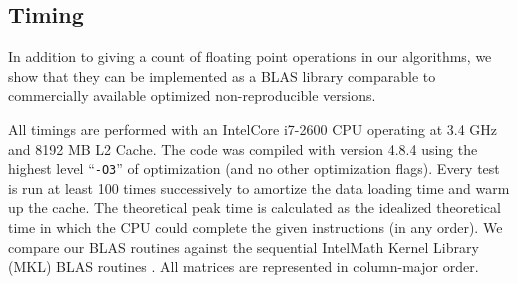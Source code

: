 \subsection{Timing}
  In addition to giving a count of floating point operations in our algorithms, we show that they can be implemented as a BLAS library comparable to commercially available optimized non-reproducible versions.

  All timings are performed with an Intel\textregistered Core i7-2600 CPU operating at 3.4 GHz and 8192 MB L2 Cache. The code was compiled with  version 4.8.4 using the highest level ``\texttt{-O3}'' of optimization (and no other optimization flags). Every test is run at least 100 times successively to amortize the data loading time and warm up the cache. The theoretical peak time is calculated as the idealized theoretical time in which the CPU could complete the given instructions (in any order). We compare our BLAS routines against the sequential Intel\textregistered Math Kernel Library (MKL) BLAS routines \cite{MKL}. All matrices are represented in column-major order.

